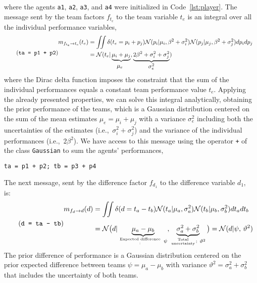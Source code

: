 \documentclass[article]{jss}
\newcommand{\N}{\mathcal{N}}
\newcommand\hfrac[2]{\genfrac{}{}{0pt}{}{#1}{#2}} %
\begin{document}
where the agents \texttt{a1}, \texttt{a2}, \texttt{a3}, and \texttt{a4} were initialized in Code~\ref{lst:player}. 
The message sent by the team factors $f_{t_e}$ to the team variable $t_e$ is an integral over all the individual performance variables,
\begin{equation*} \label{eq:m_ft_t} \tag{\texttt{ta = p1 + p2}}
\begin{split}
 m_{f_{t_e} \rightarrow t_e}(t_e) &= \iint \delta(t_e = p_i + p_j) \N(p_i|\mu_i,\beta^2 + \sigma_i^2)\N(p_j|\mu_j,\beta^2 + \sigma_j^2) dp_idp_j  \\ &=  \N(t_e|\underbrace{\mu_i+\mu_j}_{\text{\normalsize $\mu_e\phantom{^2}$}}, \underbrace{2\beta^2 + \sigma_i^2 + \sigma_j^2}_{\text{\normalsize $\sigma_e^2$}})
\end{split}
\end{equation*}
where the Dirac delta function imposes the constraint that the sum of the individual performances equals a constant team performance value $t_e$. 
Applying the already presented properties, we can solve this integral analytically, obtaining the prior performance of the teams, which is a Gaussian distribution centered on the sum of the mean estimates $\mu_e = \mu_i + \mu_j$ with a variance $\sigma_e^2$ including both the uncertainties of the estimates (i.e.,~$\sigma_i^2 + \sigma_j^2$) and the variance of the individual performances (i.e.,~2$\beta^2$). 
We have access to this message using the operator \texttt{+} of the class \texttt{Gaussian} to sum the agents' performances,
\begin{lstlisting}[captionpos=b,backgroundcolor=\color{all},label=lst:team_performance, caption={Computing the team prior performance.}, belowskip=0cm]
ta = p1 + p2; tb = p3 + p4
\end{lstlisting}
%
The next message, sent by the difference factor $f_{d_1}$ to the difference variable $d_1$, is:
\begin{equation*}\label{eq:m_fd_d} \tag{\texttt{d = ta - tb}}
 \begin{split} 
  m_{f_{d} \rightarrow d}(d) & = \iint \delta(d = t_a - t_b) \N(t_a| \mu_a, \sigma_a^2)  \N(t_b| \mu_b, \sigma_b^2)  dt_adt_b \\[0.25cm]
  & = \N\big( d | \underbrace{\mu_a - \mu_b}_{\hfrac{\text{Expected difference}}:  \ \psi}, \underbrace{\sigma_a^2 +\sigma_b^2}_{\hfrac{\text{Total}}{\text{uncertainty}} : \ \vartheta^2}  \big) = \N(d | \psi, \, \vartheta^2)
 \end{split}
\end{equation*}
%
The prior difference of performance is a Gaussian distribution centered on the prior expected difference between teams $\psi = \mu_a - \mu_b$ with variance $\vartheta^2 = \sigma_a^2 + \sigma_b^2$ that includes the uncertainty of both teams. 
\end{document}
